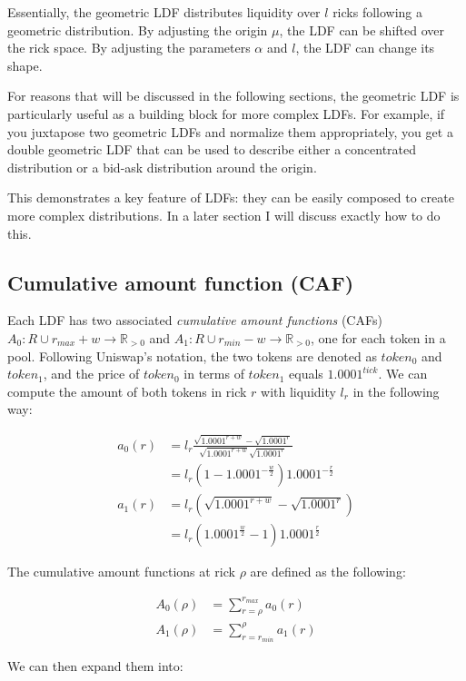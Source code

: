 \documentclass[twocolumn]{article}
\begin{document}
Essentially, the geometric LDF distributes liquidity over $l$ ricks following a geometric distribution. By adjusting the origin $\mu$, the LDF can be shifted over the rick space. By adjusting the parameters $\alpha$ and $l$, the LDF can change its shape.

For reasons that will be discussed in the following sections, the geometric LDF is particularly useful as a building block for more complex LDFs. For example, if you juxtapose two geometric LDFs and normalize them appropriately, you get a double geometric LDF that can be used to describe either a concentrated distribution or a bid-ask distribution around the origin.

This demonstrates a key feature of LDFs: they can be easily composed to create more complex distributions. In a later section I will discuss exactly how to do this.

\subsection{Cumulative amount function (CAF)}

Each LDF has two associated \textit{cumulative amount functions} (CAFs) $A_0: R \cup {r_{max}+w} \to \mathbb R_{>0}$ and $A_1: R \cup {r_{min} - w} \to \mathbb R_{>0}$, one for each token in a pool. Following Uniswap's notation, the two tokens are denoted as $token_0$ and $token_1$, and the price of $token_0$ in terms of $token_1$ equals $1.0001^{tick}$. We can compute the amount of both tokens in rick $r$ with liquidity $l_r$ in the following way:

\begin{align}
a_0(r) &= l_r \frac{\sqrt{1.0001^{r+w}} - \sqrt{1.0001^r}}{\sqrt{1.0001^{r+w}}\sqrt{1.0001^r}} \\
       &= l_r (1-1.0001^{-\frac{w}{2}})1.0001^{-\frac{r}{2}} \\
a_1(r) &= l_r (\sqrt{1.0001^{r+w}} - \sqrt{1.0001^r}) \\
       &= l_r(1.0001^\frac{w}{2} - 1) 1.0001^\frac{r}{2}
\end{align}

The cumulative amount functions at rick $\rho$ are defined as the following:

\begin{align}
A_0(\rho) &= \sum_{r = \rho}^{r_{max}} a_0(r) \\
A_1(\rho) &= \sum_{r = r_{min}}^{\rho} a_1(r)  
\end{align}

We can then expand them into:
\end{document}

